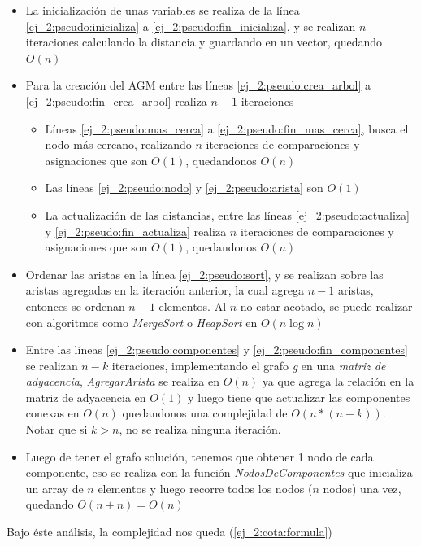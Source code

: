 \begin{itemize}
	\item La inicializaci\'on de unas variables se realiza de la l\'inea \ref{ej_2:pseudo:inicializa} a \ref{ej_2:pseudo:fin_inicializa}, y se realizan $n$ iteraciones calculando la distancia y guardando en un vector, quedando $O(n)$
	\item Para la creaci\'on del AGM entre las l\'ineas \ref{ej_2:pseudo:crea_arbol} a \ref{ej_2:pseudo:fin_crea_arbol} realiza $n - 1$ iteraciones
	\begin{itemize}
		\item L\'ineas \ref{ej_2:pseudo:mas_cerca} a \ref{ej_2:pseudo:fin_mas_cerca}, busca el nodo m\'as cercano, realizando $n$ iteraciones de comparaciones y asignaciones que son $O(1)$, quedandonos $O(n)$
		\item Las l\'ineas \ref{ej_2:pseudo:nodo} y \ref{ej_2:pseudo:arista} son $O(1)$
		\item La actualizaci\'on de las distancias, entre las l\'ineas \ref{ej_2:pseudo:actualiza} y \ref{ej_2:pseudo:fin_actualiza} realiza $n$ iteraciones de comparaciones y asignaciones que son $O(1)$, quedandonos $O(n)$
	\end{itemize}
	\item Ordenar las aristas en la l\'inea \ref{ej_2:pseudo:sort}, y se realizan sobre las aristas agregadas en la iteraci\'on anterior, la cual agrega $n-1$ aristas, entonces se ordenan $n - 1$ elementos. Al $n$ no estar acotado, se puede realizar con algoritmos como \emph{MergeSort} o \emph{HeapSort} en $O(n \log n)$
	\item Entre las l\'ineas \ref{ej_2:pseudo:componentes} y \ref{ej_2:pseudo:fin_componentes} se realizan $n - k$ iteraciones, implementando el grafo \emph{g} en una \emph{matriz de adyacencia}, \emph{AgregarArista} se realiza en $O(n)$ ya que agrega la relaci\'on en la matriz de adyacencia en $O(1)$ y luego tiene que actualizar las componentes conexas en $O(n)$ quedandonos una complejidad de $O(n * (n - k))$. Notar que si $k > n$, no se realiza ninguna iteraci\'on.
	\item Luego de tener el grafo soluci\'on, tenemos que obtener 1 nodo de cada componente, eso se realiza con la funci\'on \emph{NodosDeComponentes} que inicializa un array de $n$ elementos y luego recorre todos los nodos ($n$ nodos) una vez, quedando $O(n + n) = O(n)$
\end{itemize}

Bajo \'este an\'alisis, la complejidad nos queda (\ref{ej_2:cota:formula})

